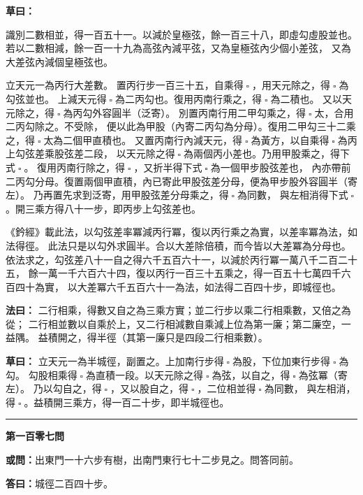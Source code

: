 \documentclass[11pt,a4paper]{article}
\let\origsquare\square
\renewcommand{\square}{\ensuremath{\origsquare}}%
\newcommand{\longline}{\noindent\rule{\textwidth}{0.4pt}}
\newcommand{\owen}[1]{%
  \par\vspace{0.4em}%
  \noindent\textcolor{problemcolor}{\textbf{或問：}}{\tradfont #1}\par\nopagebreak%
}
\newcommand{\fayue}[1]{%
  \par\noindent\textcolor{methodcolor}{\textbf{法曰：}}{\tradfont #1}\par\nopagebreak%
}
\newcommand{\tsaoyue}[1]{%
  \par\noindent\textcolor{workcolor}{\textbf{草曰：}}{\tradfont #1}\par%
}
\newcommand{\dayue}[1]{%
  \par\noindent\textcolor{anscolor}{\textbf{答曰：}}{\tradfont #1}\par\nopagebreak%
}
\newcommand{\wen}[1]{\par\vspace{0.3em}\noindent\textcolor{problemcolor}{\textbf{第#1問}}\par}
\begin{document}
\tsaoyue{%
識別二數相並，得一百五十一。以減於皇極弦，餘一百三十八，即虛勾虛股並也。
若以二數相減，餘一百一十九為高弦內減平弦，又為皇極弦內少個小差弦，
又為大差弦內減個皇極弦也。

立天元一為丙行大差數。
置丙行步一百三十五，自乘得$ \; \square \; $，用天元除之，得$ \; \square \; $為勾弦並也。
上減天元得$ \; \square \; $為二丙勾也。復用丙南行乘之，得$ \; \square \; $為二積也。
又以天元除之，得$ \; \square \; $為丙勾外容圓半（泛寄）。
別置丙南行用二甲勾乘之，得$ \; \square \; $太，合用二丙勾除之。不受除，
便以此為甲股（內寄二丙勾為分母）。復用二甲勾三十二乘之，得$ \; \square \; $太為二個甲直積也。
又置丙南行內減天元，得$ \; \square \; $為黃方，以自乘得$ \; \square \; $為丙上勾弦差乘股弦差二段，
以天元除之得$ \; \square \; $為兩個丙小差也。乃用甲股乘之，得下式$ \; \square \; $。
復用丙南行除之，得$ \; \square \; $，又折半得下式$ \; \square \; $為一個甲步股弦差也，
內亦帶前二丙勾分母。復置兩個甲直積，內已寄此甲股弦差分母，便為甲步股外容圓半（寄左）。
乃再置先求到泛寄，用甲股弦差分母乘之，得$ \; \square \; $為同數，
與左相消得下式$ \; \square \; $。開三乘方得八十一步，即丙步上勾弦差也。

《鈐經》載此法，以勾弦差率冪減丙行冪，復以丙行乘之為實，以差率冪為法，如法得徑。
此法只是以勾外求圓半。合以大差除倍積，而今皆以大差冪為分母也。
依法求之，勾弦差八十一自之得六千五百六十一，以減於丙行冪一萬八千二百二十五，
餘一萬一千六百六十四，復以丙行一百三十五乘之，得一百五十七萬四千六百四十為實，
以大差冪六千五百六十一為法，如法得二百四十步，即城徑也。}

\fayue{%
二行相乘，得數又自之為三乘方實；並二行步以乘二行相乘數，又倍之為從；
二行相並數以自乘於上，又二行相減數自乘減上位為第一廉；第二廉空，一益隅。
益積開之，得半徑（其第一廉只是四段二行相乘數）。}

\tsaoyue{%
立天元一為半城徑，副置之。上加南行步得$ \; \square \; $為股，下位加東行步得$ \; \square \; $為勾。
勾股相乘得$ \; \square \; $為直積一段。以天元除之得$ \; \square \; $為弦，以自之，得$ \; \square \; $為弦冪（寄左）。
乃以勾自之，得$ \; \square \; $，又以股自之，得$ \; \square \; $，二位相並得$ \; \square \; $為同數，
與左相消，得$ \; \square \; $。益積開三乘方，得一百二十步，即半城徑也。}

\vspace{0.5cm}
\begin{center}
\longline
\end{center}

\wen{一百零七}
\owen{出東門一十六步有樹，出南門東行七十二步見之。問答同前。}
\dayue{城徑二百四十步。}
\end{document}
